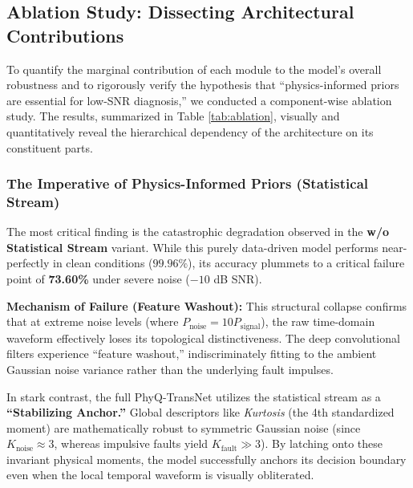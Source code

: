 \documentclass[5p,times,twocolumn]{elsarticle}
\begin{document}
\subsection{Ablation Study: Dissecting Architectural Contributions}
\label{sec:ablation}
To quantify the marginal contribution of each module to the model's overall robustness and to rigorously verify the hypothesis that ``physics-informed priors are essential for low-SNR diagnosis,'' we conducted a component-wise ablation study. The results, summarized in Table \ref{tab:ablation}, visually and quantitatively reveal the hierarchical dependency of the architecture on its constituent parts.

\subsubsection{The Imperative of Physics-Informed Priors (Statistical Stream)}
The most critical finding is the catastrophic degradation observed in the \textbf{w/o Statistical Stream} variant. While this purely data-driven model performs near-perfectly in clean conditions ($99.96\%$), its accuracy plummets to a critical failure point of \textbf{73.60\%} under severe noise ($-10$ dB SNR).

\textbf{Mechanism of Failure (Feature Washout):} This structural collapse confirms that at extreme noise levels (where $P_{\text{noise}} = 10 P_{\text{signal}}$), the raw time-domain waveform effectively loses its topological distinctiveness. The deep convolutional filters experience ``feature washout,'' indiscriminately fitting to the ambient Gaussian noise variance rather than the underlying fault impulses. 

In stark contrast, the full PhyQ-TransNet utilizes the statistical stream as a \textbf{``Stabilizing Anchor.''} Global descriptors like \textit{Kurtosis} (the 4th standardized moment) are mathematically robust to symmetric Gaussian noise (since $K_{\text{noise}} \approx 3$, whereas impulsive faults yield $K_{\text{fault}} \gg 3$). By latching onto these invariant physical moments, the model successfully anchors its decision boundary even when the local temporal waveform is visually obliterated.
\end{document}
